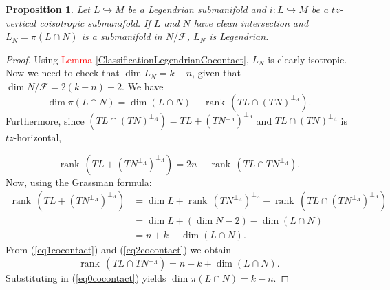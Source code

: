 \documentclass[12pt]{article}
\newtheorem{prop}{Proposition}[section]
\renewcommand{\dim}{\operatorname{dim}}
\begin{document}
\begin{prop} \label{ProjectionLegendrianTZvertical}Let $L \hookrightarrow M$ be a Legendrian submanifold and $i: L \hookrightarrow M$ be a $tz$-vertical coisotropic submanifold. If $L$ and $N$ have clean intersection and $L_N 
= \pi(L \cap N)$ is a submanifold in $N/\mathcal{F}$, $L_N$ is Legendrian.
\end{prop}
\begin{proof} Using \textcolor{red}{Lemma \ref{ClassificationLegendrianCocontact}}, $L_N$ is clearly isotropic. Now we need to check that $\dim L_N = k - n$, given that $\dim N/\mathcal{F} = 2(k-n) + 2.$  We have 
\begin{equation}\label{eq0cocontact}
    \dim \pi(L \cap N) = \dim(L \cap N) - \operatorname{rank}\, (TL \cap (TN)^{\perp_\Lambda}).
\end{equation}
Furthermore, since $(TL \cap (TN)^{\perp_\Lambda}) = TL + (TN^{\perp_\Lambda})^{\perp_\Lambda}$ and $TL \cap (TN)^{\perp_\Lambda}$ is $tz$-horizontal, 

\begin{equation}\label{eq1cocontact}
    \operatorname{rank} \,(TL + (TN^{\perp_\Lambda})^{\perp_\Lambda}) = 2n - \operatorname{rank}\, (TL \cap TN^{\perp_\Lambda}).
\end{equation}
Now, using the Grassman formula:
\begin{align}
    \operatorname{rank} \,(TL + (TN^{\perp_\Lambda})^{\perp_\Lambda}) &= \dim L + \operatorname{rank} \, (TN^{\perp_\Lambda})^{\perp_\Lambda} - \operatorname{rank} \, (TL \cap (TN^{\perp_\Lambda})^{\perp_\Lambda})\\
    &= \dim L + (\dim N - 2) - \dim(L \cap N)\\& = n + k - \dim(L \cap N). \label{eq2cocontact}
\end{align}
From (\ref{eq1cocontact}) and (\ref{eq2cocontact}) we obtain 
\begin{equation}
    \operatorname{rank} \,(TL \cap TN^{\perp_\Lambda}) = n - k + \dim(L \cap N).
\end{equation}
Substituting in (\ref{eq0cocontact}) yields $\dim \pi(L \cap N) = k - n.$
\end{proof}
\end{document}
